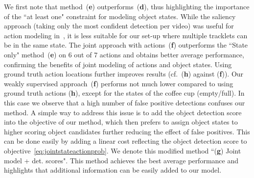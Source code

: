 We first note that method~(\textbf{e}) outperforms~(\textbf{d}), thus highlighting the importance of the ``at least one" constraint for modeling object states.
While the saliency approach (taking only the most confident detection per video) was useful for action modeling in~\cite{Bojanowski15weakly}, it is less suitable for our set-up where multiple tracklets can be in the same state.
%
The joint approach with actions~(\textbf{f}) outperforms the ``State only" method~(\textbf{e}) on 6 out of 7 actions and obtains better average performance,  confirming the benefits of joint modeling of actions and object states.
Using ground truth action locations further improves results (cf.~(\textbf{h}) against (\textbf{f})).
Our weakly supervised approach~(\textbf{f}) performs not much lower compared to using ground truth actions (\textbf{h}), except for the states of the coffee cup (empty/full). In this case we observe that a high number of false positive detections confuses our method.
A simple way to address this issue is to add the object detection score into the objective of our method, which then prefers to assign object states to higher scoring object candidates further reducing the effect of false positives.  
This can be done easily by adding a linear cost reflecting the object detection score to objective~\eqref{eq:jointstateactionprob}.
We denote this modified method ``(\textbf{g}) Joint model + det. scores". 
This method achieves the best average performance and highlights that additional information can be easily added to our model.


